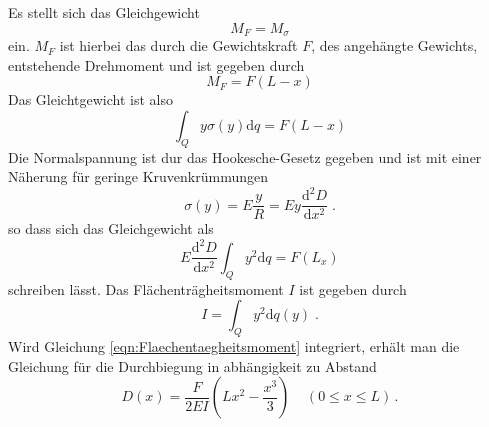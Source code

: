 Es stellt sich das Gleichgewicht
\begin{equation}
  M_F=M_\sigma
\end{equation}
ein. $M_F$ ist hierbei das durch die Gewichtskraft $F$, des angehängte Gewichts,
entstehende Drehmoment
und ist gegeben durch
\begin{equation}
  M_F=F(L-x)
\end{equation}
Das Gleichtgewicht ist also
\begin{equation}
  \int_Q y\sigma(y)\text{d}q=F(L-x)
\end{equation}
Die Normalspannung ist dur das Hookesche-Gesetz gegeben und ist mit einer Näherung
für geringe Kruvenkrümmungen
\begin{equation}
  \sigma(y)=E\frac{y}{R}=Ey\frac{\text{d}^2D}{\text{d}x^2}\;.
\end{equation}
so dass sich das Gleichgewicht als
\begin{equation}
  E\frac{\text{d}^2D}{\text{d}x^2}\int_Q y^2\text{d}q=F(L_x)
\end{equation}
schreiben lässt. Das Flächenträgheitsmoment $I$ ist gegeben durch
\begin{equation}
  I=\int_Q y^2 \text{d}q(y)\;.
  \label{eqn:Flaechentaegheitsmoment}
\end{equation}
Wird Gleichung \eqref{eqn:Flaechentaegheitsmoment} integriert, erhält man die Gleichung für die Durchbiegung
in abhängigkeit zu Abstand
\begin{equation}
  D(x)=\frac{F}{2EI}\left(Lx^2-\frac{x^3}{3}\right)\;\;\;\;(0\le x \le L)\,.
\end{equation}
